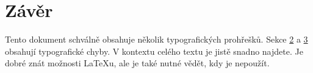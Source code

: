 \documentclass[10pt,a4paper,twocolumn]{article}
\begin{document}
    \section{Závěr}
        Tento dokument schválně obsahuje několik typografických prohřešků. Sekce \hyperlink{Smíšená vazba}{2} a \hyperlink{Smíšená vazba}{3} obsahují typografické chyby. V kontextu celého textu je jistě snadno najdete. Je dobré znát možnosti \LaTeX u, ale je také nutné vědět, kdy je nepoužít.
\end{document}
